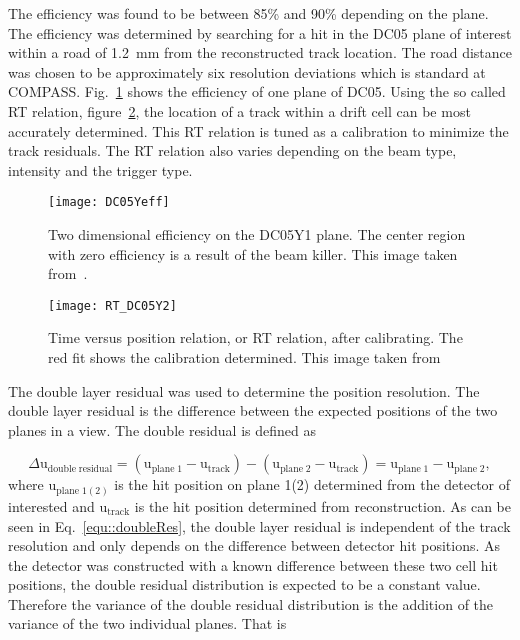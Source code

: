 The efficiency was found to be between 85\% and 90\% depending on the plane.
The efficiency was determined by searching for a hit in the DC05 plane of
interest within a road of 1.2~mm from the reconstructed track location.  The
road distance was chosen to be approximately six resolution deviations which is
standard at COMPASS.  Fig.~\ref{fig::DC05Yeff} shows the efficiency of one plane
of DC05.  Using the so called RT relation, figure~\ref{fig:RT_DC05Y2}, the
location of a track within a drift cell can be most accurately determined.  This
RT relation is tuned as a calibration to minimize the track residuals.  The RT
relation also varies depending on the beam type, intensity and the trigger type.

\begin{figure}[h!t]
  \centering \texttt{[image: DC05Yeff]}
  \caption{}{Two dimensional efficiency on the DC05Y1 plane.  The center region
    with zero efficiency is a result of the beam killer.  This image taken
    from~\cite{heitzDC05Spin}.}
  \label{fig::DC05Yeff}%
\end{figure}

\begin{figure}[h!t]
  \centering \texttt{[image: RT\_DC05Y2]}
  \caption{}{Time versus position relation, or RT relation, after calibrating.
    The red fit shows the calibration determined.  This image taken
    from~\cite{heitzDC05Spin}}
  \label{fig:RT_DC05Y2}%
\end{figure}

The double layer residual was used to determine the position resolution.  The
double layer residual is the difference between the expected positions of the
two planes in a view.  The double residual is defined as

\begin{equation}
  \label{equ::doubleRes}
  \Delta \mathrm{u}_{\mathrm{double \; residual}} = (\mathrm{u}_{\mathrm{plane
      \; 1}} - \mathrm{u}_{\mathrm{track}}) - (\mathrm{u}_{\mathrm{plane \; 2}}
  - \mathrm{u}_{\mathrm{track}}) = \mathrm{u}_{\mathrm{plane \; 1}} -
  \mathrm{u}_{\mathrm{plane \; 2}},
\end{equation}
\noindent
where u$_{\mathrm{plane \; 1(2)}}$ is the hit position on plane 1(2) determined
from the detector of interested and u$_{\mathrm{track}}$ is the hit position
determined from reconstruction.  As can be seen in Eq.~\ref{equ::doubleRes}, the
double layer residual is independent of the track resolution and only depends on
the difference between detector hit positions.  As the detector was constructed
with a known difference between these two cell hit positions, the double
residual distribution is expected to be a constant value.  Therefore the
variance of the double residual distribution is the addition of the variance of
the two individual planes.  That is

